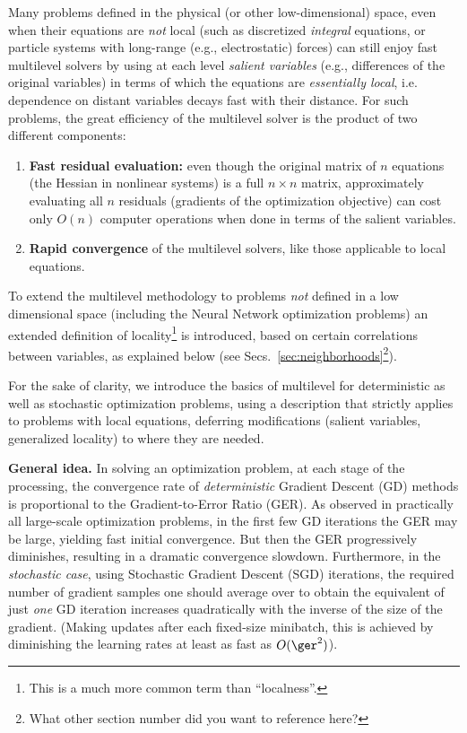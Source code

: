 \documentclass{article} %
\begin{document}
Many problems defined in the physical (or other low-dimensional) space, even when their equations are {\it not} local (such as discretized {\it integral} equations, or particle systems with long-range (e.g., electrostatic) forces) can still enjoy fast multilevel solvers by using at each level {\it salient variables} (e.g., differences of the original variables) in terms of which the equations are {\it essentially local}, i.e. dependence on distant variables decays fast with their distance. For such problems, the great efficiency of the multilevel solver is the product of two different components:
\begin{enumerate}
    \item[(1)] {\bf Fast residual evaluation:} even though the original matrix of $n$ equations (the Hessian in nonlinear systems) is a full $n \times n$ matrix, approximately evaluating all $n$ residuals (gradients of the optimization objective) can cost only $O(n)$ computer operations when done in terms of the salient variables.
    \item[(2)] {\bf Rapid convergence} of the multilevel solvers, like those applicable to local equations.
\end{enumerate}
To extend the multilevel methodology to problems {\it not} defined in a low dimensional space (including the Neural Network optimization problems) an extended definition of locality\footnote{This is a much more common term than ``localness''.} is introduced, based on certain correlations between variables, as explained below (see Secs.~\ref{sec:neighborhoods}\footnote{What other section number did you want to reference here?}).

For the sake of clarity, we introduce the basics of multilevel for deterministic as well as stochastic optimization problems, using a description that strictly applies to problems with local equations, deferring modifications (salient variables, generalized locality) to where they are needed.

{\bf General idea.} In solving an optimization problem, at each stage of the processing, the convergence rate of {\it deterministic} Gradient Descent (GD) methods is proportional to the Gradient-to-Error Ratio (GER). As observed in practically all large-scale optimization problems, in the first few GD iterations the GER may be large, yielding fast initial convergence. But then the GER progressively diminishes, resulting in a dramatic convergence slowdown. Furthermore, in the {\it stochastic case}, using Stochastic Gradient Descent (SGD) iterations, the required number of gradient samples one should average over to obtain the equivalent of just {\it one} GD iteration increases quadratically with the inverse of the size of the gradient. (Making updates after each fixed-size minibatch, this is achieved by diminishing the learning rates at least as fast as $O(\ger^2)$).
\end{document}
